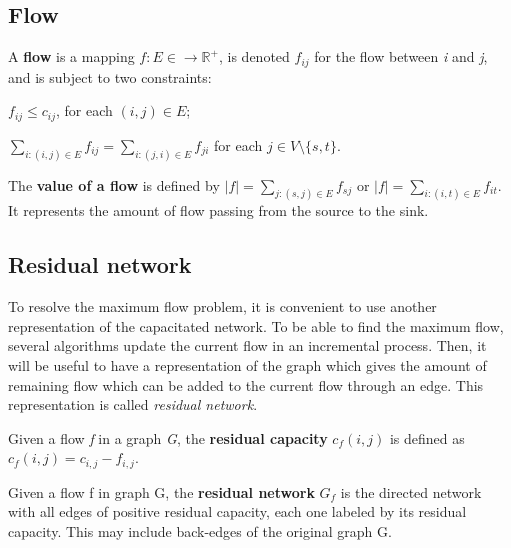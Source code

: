 \subsection{Flow}
\begin{definition}
\label{flow}
A \textbf{flow} is a mapping $f: E \in \to \mathbb{R}^{+}$, is denoted $f_{ij}$ for the flow between \textit{i} and \textit{j}, and is subject to two constraints:
\indent
\begin{description}
	\label{cap_constraint}
	\item[Capacity constraint] $f_{ij} \leq c_{ij}$, for each $(i, j) \in E$;
	\label{flow_constraint}
	\item[Flow conservation constraint] $\sum\limits_{i : (i,j) \in E} f_{ij} = \sum\limits_{i : (j,i) \in E} f_{ji}$ for each $j \in V \setminus \{s, t\}$.
\end{description}
\end{definition}

\begin{definition}
\label{vflow}
The \textbf{value of a flow} is defined by $\left\vert{f}\right\vert = \sum\limits_{j:(s,j) \in E} f_{sj}$ or $\left\vert{f}\right\vert = \sum\limits_{i:(i,t) \in E} f_{it}$. It represents the amount of flow passing from the source to the sink.
\end{definition}

\subsection{Residual network} 
To resolve the maximum flow problem, it is convenient to use another representation of the capacitated network. To be able to find the maximum flow, several algorithms update the current flow in an incremental process. Then, it will be useful to have a representation of the graph which gives the amount of remaining flow which can be added to the current flow through an edge. This representation is called \textit{residual network}.
\begin{definition}
\label{rcapacity}
Given a flow \textit{f} in a graph \textit{G}, the \textbf{residual capacity} $c_f (i,j)$ is defined as $c_f (i,j) = c_{i,j} - f_{i,j}$.
\end{definition}


\begin{definition}
\label{rnetwork}
Given a flow f in graph G, the \textbf{residual network} $G_f$ is the directed network with all edges of positive residual capacity, each one labeled by its residual capacity. This may include back-edges of the original graph G.
\end{definition}

